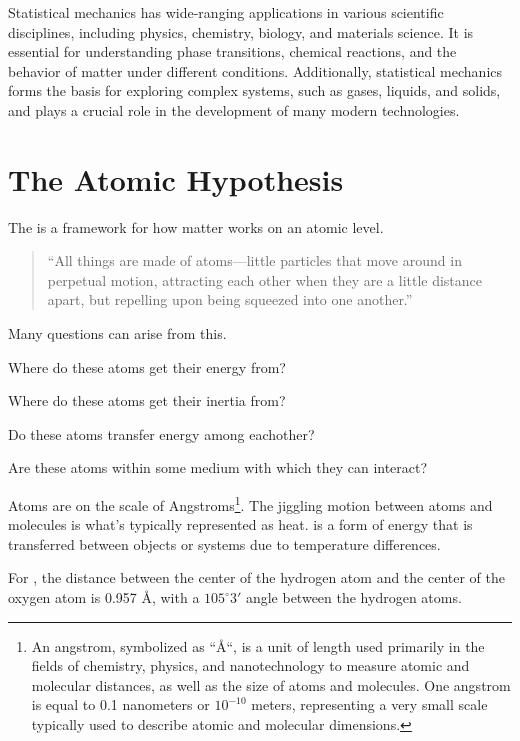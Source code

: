 Statistical mechanics has wide-ranging applications in various scientific disciplines, including physics, chemistry, biology, and materials science. It is essential for understanding phase transitions, chemical reactions, and the behavior of matter under different conditions. Additionally, statistical mechanics forms the basis for exploring complex systems, such as gases, liquids, and solids, and plays a crucial role in the development of many modern technologies.

\section{The Atomic Hypothesis}

The  is a framework for how matter works on an atomic level.

\begin{quotation}
	``All things are made of atoms—little particles that move around in perpetual motion, attracting each other when they are a little distance apart, but repelling upon being squeezed into one another.''
\end{quotation}

Many questions can arise from this.

\begin{questions}
	\item Where do these atoms get their energy from?
 	\item Where do these atoms get their inertia from?
  	\item Do these atoms transfer energy among eachother?
   	\item Are these atoms within some medium with which they can interact?
\end{questions}

Atoms are on the scale of Angstroms\footnote{An angstrom, symbolized as ``\AA``, is a unit of length used primarily in the fields of chemistry, physics, and nanotechnology to measure atomic and molecular distances, as well as the size of atoms and molecules. One angstrom is equal to 0.1 nanometers or $10^{-10}$ meters, representing a very small scale typically used to describe atomic and molecular dimensions.}. The jiggling motion between atoms and molecules is what's typically represented as heat.  is a form of energy that is transferred between objects or systems due to temperature differences.

\begin{interestnote}
	For , the distance between the center of the hydrogen atom and the center of the oxygen atom is 0.957 \AA, with a $105^\circ3'$ angle between the hydrogen atoms.
\end{interestnote}

